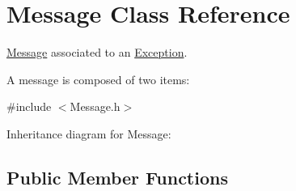 \hypertarget{class_message}{\section{Message Class Reference}
\label{class_message}
}


\hyperlink{class_message}{Message} associated to an \hyperlink{class_exception}{Exception}.

A message is composed of two items\+:  




{\ttfamily \#include $<$Message.\+h$>$}



Inheritance diagram for Message\+:
\subsection*{Public Member Functions}
